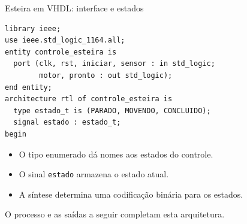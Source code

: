 \begin{frame}[fragile,t]{Esteira em VHDL: interface e estados}
\begin{lstlisting}
library ieee;
use ieee.std_logic_1164.all;
entity controle_esteira is
  port (clk, rst, iniciar, sensor : in std_logic;
        motor, pronto : out std_logic);
end entity;
architecture rtl of controle_esteira is
  type estado_t is (PARADO, MOVENDO, CONCLUIDO);
  signal estado : estado_t;
begin
\end{lstlisting}\begin{itemize}
\item O tipo enumerado dá nomes aos estados do controle.
\item O sinal \texttt{estado} armazena o estado atual.
\item A síntese determina uma codificação binária para os estados.
\end{itemize}
\small O processo e as saídas a seguir completam esta arquitetura.
\end{frame}
